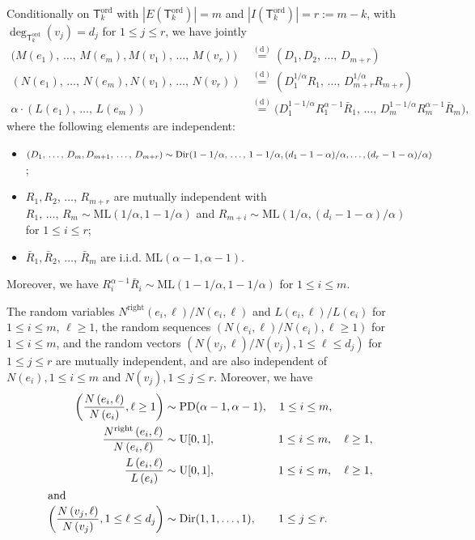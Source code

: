 \documentclass[AHL,Unicode,longabstracts,published]{cedram}
\newcommand{\equidist}{\ensuremath{\stackrel{\mathrm{(d)}}{=}}}
\newcommand{\ord}{\mathrm{ord}}
\newcommand{\ML}{\mathrm{ML}}
\newcommand{\PD}{\mathrm{PD}}
\newcommand{\Rightll}{\mathrm{right}}
\newcommand{\rmU}{\mathrm{U}}
\newcommand{\Dir}{\mathrm{Dir}}
\newcommand{\sT}{\mathsf{T}}
\begin{document}
\begin{prop}\label{prop:jointlaws}
Conditionally on $\sT_k^{\ord}$ with $|E(\sT_k^{\ord})| = m$ and $|I(\sT_k^{\ord})| = r := m-k$, with $\deg_{\sT_k^{\ord}}(v_j) = d_j$ for $1 \le j \le r$, we have jointly
\begin{align*}
\big(M(e_1),\,\ldots,\,M(e_{m}), M(v_1),\,\ldots, \,M(v_r) \big) & \equidist \left(D_1, D_2,\,\ldots,\, D_{m+r}\right)\\
\left(N(e_1),\,\ldots,\,N(e_m), N(v_1),\,\ldots,\, N(v_r) \right) & \equidist \left(D_1^{1/\alpha} R_1, \,\ldots,\,D_{m+r}^{1/\alpha} R_{m+r}\right) \\
\alpha \cdot \left(L(e_1),\,\ldots,\,L(e_m) \right) & \equidist
 \big(D_1^{1-1/\alpha} R_1^{\alpha-1} \bar{R}_1,\,\ldots,\, D_m^{1-1/\alpha} R_m^{\alpha-1} \bar{R}_m\big),
\end{align*}
where the following elements are independent:
\begin{itemize}
\item $(D_1,\,\ldots,\,D_m, D_{m+1},\,\ldots,\,D_{m+r}) \sim \Dir(1-1/\alpha,\,\ldots,\,1-1/\alpha, (d_1-1-\alpha)/\alpha,\linebreak\ldots,(d_r-1-\alpha)/\alpha)$;
\item $R_1, R_2,\,\ldots,\,R_{m+r}$ are mutually independent with $R_1,\,\ldots,\,R_m \sim \ML(1/\alpha,1-1/\alpha)$ and $R_{m+i} \sim \ML(1/\alpha,(d_i-1-\alpha)/\alpha)$ for $ 1 \le i \le r$;
\item $\bar{R}_1, \bar{R}_2,\,\ldots,\,\bar{R}_m$ are i.i.d. $\ML(\alpha-1,\alpha-1)$.
\end{itemize}
Moreover, we have $R_i^{\alpha-1}\bar{R}_i \sim \ML(1-1/\alpha, 1-1/\alpha)$ for $1 \le i \le m$.

The random variables $N^{\Rightll}(e_i,\ell)/N(e_i, \ell)$ and $L(e_i,\ell)/L(e_i)$ for $1 \le i \le m$, $\ell \ge 1$, the random sequences $(N(e_i, \ell)/N(e_i), \ell \ge 1)$ for $1 \le i \le m$, and the random vectors $(N(v_j, \ell)/N(v_j), 1 \le \ell \le d_j)$ for $1 \le j \le r$ are mutually independent, and are also independent of $N(e_i), 1 \le i \le m$ and $N(v_j), 1 \le j \le r$. Moreover, we have
\begin{align*}
\left(\frac{N\left(e_i,\ell\right)}{N\left(e_i\right)}, \ell \ge 1\right) &\sim \PD(\alpha-1,\alpha-1),\quad 1 \le i \le m,
\\
\frac{N^{\Rightll}\left(e_i, \ell\right)}{N\left(e_i, \ell\right)} &\sim \rmU[0,1], \mkern100mu 1 \le i \le m, \quad \ell \ge 1,
\\
\frac{L\left(e_i,\ell\right)}{L\left(e_i\right)}&\sim \rmU[0,1], \mkern100mu 1 \le i \le m, \quad \ell \ge 1,\\
\intertext{and}
\left(\frac{N\left(v_j, \ell\right)}{N\left(v_j\right)}, 1 \le \ell \le d_j\right) &\sim \Dir(1,1,\ldots,1), \mkern35mu 1 \le j \le r.
\end{align*}
\end{prop}
\end{document}
